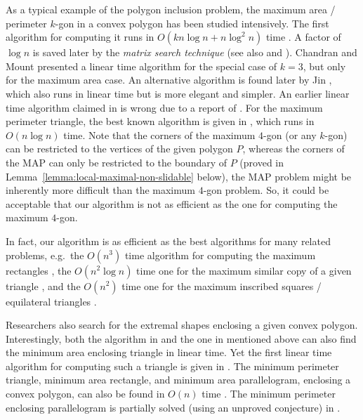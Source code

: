 \documentclass{ws-ijcga}
\begin{document}
As a typical example of the polygon inclusion problem, the maximum area / perimeter $k$-gon in a convex polygon has been studied intensively.
The first algorithm for computing it runs in $O(kn\log n+n \log^2n)$ time \cite{Kgon-extremal-STOC82}.
A factor of $\log n$ is saved later by the \emph{matrix search technique} \cite{Kgon-Matrixsearch-Algc87} (see also \cite{Kgon-Klink-DCG94} and \cite{Kgon-Klink-soda95}).
Chandran and Mount \cite{Triangle-correct-IJCGA02} presented a linear time algorithm for the special case of $k=3$, but only for the maximum area case.
An alternative algorithm is found later by Jin \cite{Triangle-ultimate-Arxiv}, which also runs in linear time but is more elegant and simpler.
An earlier linear time algorithm claimed in \cite{Triangle-wrong-FOCS79} is wrong due to a report of \cite{Triangle-reportwrong-Arxiv}.
For the maximum perimeter triangle, the best known algorithm is given in \cite{Kgon-extremal-STOC82}, which runs in $O(n\log n)$ time.
Note that the corners of the maximum $4$-gon (or any $k$-gon) can be restricted to the vertices of the given polygon $P$,
  whereas the corners of the MAP can only be restricted to the boundary of $P$ (proved in Lemma~\ref{lemma:local-maximal-non-slidable} below),
    the MAP problem might be inherently more difficult than the maximum $4$-gon problem.
    So, it could be acceptable that our algorithm is not as efficient as the one for computing the maximum $4$-gon.

In fact, our algorithm is as efficient as the best algorithms for many related problems, e.g.\
    the $O(n^3)$ time algorithm for computing the maximum rectangles \cite{Othershape-rect-EuroCG14},
      the $O(n^2\log n)$ time one for the maximum similar copy of a given triangle \cite{Placement-ST-CGTA94},
      and the $O(n^2)$ time one for the maximum inscribed squares / equilateral triangles \cite{Othershape-square-Allerton87}.

\smallskip Researchers also search for the extremal shapes enclosing a given convex polygon.
Interestingly, both the algorithm in \cite{Triangle-correct-IJCGA02} and the one in \cite{Triangle-ultimate-Arxiv} mentioned above can also find the minimum area enclosing triangle in linear time.
Yet the first linear time algorithm for computing such a triangle is given in \cite{Triangle-EnclArea-JA86}.
The minimum perimeter triangle, minimum area rectangle, and minimum area parallelogram, enclosing a convex polygon, can also be found in $O(n)$ time \cite{Triangle-EnclPeri-JCDCG02,Classic-rcaliper-MEL83,3dorEncl-areaParallelogram-SOCG95}.
The minimum perimeter enclosing parallelogram is partially solved (using an unproved conjecture) in \cite{3dorEncl-periParallelogram-cccg10} .
\end{document}
